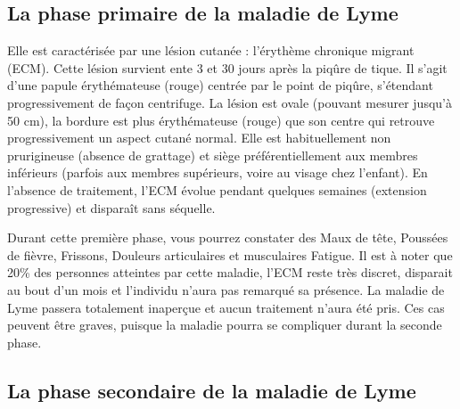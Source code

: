 \documentclass[12pt,a4wide]{article}
\begin{document}
\subsection{La phase primaire de la maladie de Lyme}
\label{sec-3-1}

Elle est caractérisée par une lésion cutanée : l'érythème chronique migrant (ECM). Cette lésion survient ente 3 et 30 jours après la piqûre de tique. Il s'agit d'une papule érythémateuse (rouge) centrée par le point de piqûre, s'étendant progressivement de façon centrifuge. La lésion est ovale (pouvant mesurer jusqu'à 50 cm), la bordure est plus érythémateuse (rouge) que son centre qui retrouve progressivement un aspect cutané normal. Elle est habituellement non prurigineuse (absence de grattage) et siège préférentiellement aux membres inférieurs (parfois aux membres supérieurs, voire au visage chez l'enfant). En l'absence de traitement, l'ECM évolue pendant quelques semaines (extension progressive) et disparaît sans séquelle.


Durant cette première phase, vous pourrez constater des Maux de tête, Poussées de fièvre, Frissons, Douleurs articulaires et musculaires Fatigue.
Il est à noter que 20\% des personnes atteintes par cette maladie, l'ECM reste très discret, disparait au bout d'un mois et l'individu n'aura pas remarqué sa présence. La maladie de Lyme passera totalement inaperçue et aucun traitement n'aura été pris. Ces cas peuvent être graves, puisque la maladie pourra se compliquer durant la seconde phase.



\subsection{La phase secondaire de la maladie de Lyme}
\label{sec-3-2}
\end{document}
